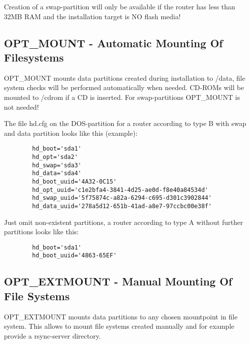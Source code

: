     Creation of a swap-partition will only be available if the router has less than 32MB 
    RAM and the installation target is NO flash media!

\subsection {OPT\_MOUNT - Automatic Mounting Of Filesystems}

    OPT\_MOUNT mounts data partitions created during installation to /data, file system 
    checks will be performed automatically when needed. CD-ROMs will be mounted to /cdrom 
    if a CD is inserted. For swap-partitions OPT\_MOUNT is not needed!

   
    
    The file hd.cfg on the DOS-partition for a router according to type B with swap and 
    data partition looks like this (example):
    \begin{verbatim}
        hd_boot='sda1'
        hd_opt='sda2'
        hd_swap='sda3'
        hd_data='sda4'
        hd_boot_uuid='4A32-0C15'
        hd_opt_uuid='c1e2bfa4-3841-4d25-ae0d-f8e40a84534d'
        hd_swap_uuid='5f75874c-a82a-6294-c695-d301c3902844'
        hd_data_uuid='278a5d12-651b-41ad-a8e7-97ccbc00e38f'
    \end{verbatim}
    
    Just omit non-existent partitions, a router according to type A 
    without further partitions looks like this:
    \begin{verbatim}
        hd_boot='sda1'
        hd_boot_uuid='4863-65EF'
     \end{verbatim}

\subsection {OPT\_EXTMOUNT - Manual Mounting Of File Systems}

    OPT\_EXTMOUNT mounts data partitions to any chosen mountpoint in
    file system. This allows to mount file systems created manually 
    and for example provide a rsync-server directory.

